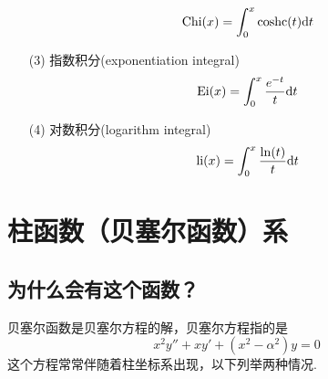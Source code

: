 \documentclass[UTF8]{ctexart}
\newcommand{\trm}[1]{{\rm #1}}
\begin{document}
\begin{itemize}
\begin{equation*}
\begin{array}{ll}
            \displaystyle{\trm{Chi}(x) = \int_{0}^{x} \trm{coshc}(t) \trm{d}t}  \\
        \end{array}
    \end{equation*}
    \item[(3)] 指数积分(exponentiation integral)
    \[ \trm{Ei}(x) = \int_{0}^{x} \frac{e^{-t}}{t} \trm{d}t \]
    \item[(4)] 对数积分(logarithm integral)
    \[ \trm{li}(x) = \int_{0}^{x} \frac{\ln(t)}{t} \trm{d}t \]
\end{itemize}

\section{柱函数（贝塞尔函数）系}

\subsection{为什么会有这个函数？}

贝塞尔函数是贝塞尔方程的解，贝塞尔方程指的是
\[x^2y″ + xy′ + (x^2-\alpha^2)y = 0\]
这个方程常常伴随着柱坐标系出现，以下列举两种情况.
\end{document}
